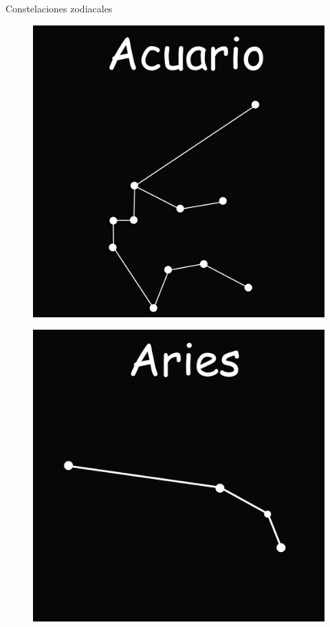 \documentclass{beamer}
\begin{document}
\begin{frame}{Constelaciones zodiacales}
 \begin{figure}
   \centering
   \includegraphics[scale=0.2]{Imagenes/Acuario_01}
  \end{figure}
\end{frame}

\begin{frame}
 \begin{figure}
   \centering
   \includegraphics[scale=0.2]{Imagenes/Aries_01}
  \end{figure}
\end{frame}
\end{document}
